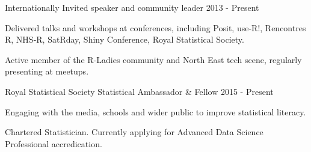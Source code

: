 \begin{cventries}

  \cventry
    {Internationally}
    {Invited speaker and community leader}
    {}
    {2013 - Present}
    {
      \begin{cvitems}
      \item{Delivered talks and workshops at conferences, including Posit, use-R!, Rencontres R, NHS-R, SatRday, Shiny Conference, Royal Statistical Society.}
      \item{Active member of the R-Ladies community and North East tech scene, regularly presenting at meetups.}
      \end{cvitems}
    }

  \cventry
    {Royal Statistical Society}
    {Statistical Ambassador \& Fellow}
    {}
    {2015 - Present}
    {
      \begin{cvitems}
        \item {Engaging with the media, schools and wider public to improve statistical literacy.}
        \item {Chartered Statistician. Currently applying for Advanced Data Science Professional accredication.}
      \end{cvitems}
    }
\end{cventries}
